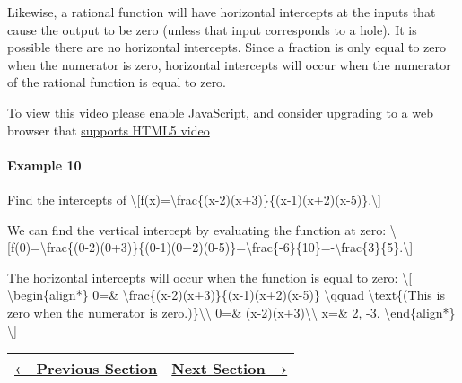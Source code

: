 Likewise, a rational function will have horizontal intercepts at the
inputs that cause the output to be zero (unless that input corresponds
to a hole). It is possible there are no horizontal intercepts. Since a
fraction is only equal to zero when the numerator is zero, horizontal
intercepts will occur when the numerator of the rational function is
equal to zero.

To view this video please enable JavaScript, and consider upgrading to a
web browser that \href{http://videojs.com/html5-video-support/}{supports
HTML5 video}

\hypertarget{example-10}{%
\paragraph{Example 10}\label{example-10}}

Find the intercepts of
\textbackslash{}{[}f(x)=\textbackslash{}frac\{(x-2)(x+3)\}\{(x-1)(x+2)(x-5)\}.\textbackslash{}{]}

We can find the vertical intercept by evaluating the function at zero:
\textbackslash{}{[}f(0)=\textbackslash{}frac\{(0-2)(0+3)\}\{(0-1)(0+2)(0-5)\}=\textbackslash{}frac\{-6\}\{10\}=-\textbackslash{}frac\{3\}\{5\}.\textbackslash{}{]}

The horizontal intercepts will occur when the function is equal to zero:
\textbackslash{}{[} \textbackslash{}begin\{align*\} 0=\&
\textbackslash{}frac\{(x-2)(x+3)\}\{(x-1)(x+2)(x-5)\}
\textbackslash{}qquad \textbackslash{}text\{(This is zero when the
numerator is zero.)\}\textbackslash{}\textbackslash{} 0=\&
(x-2)(x+3)\textbackslash{}\textbackslash{} x=\& 2, -3.
\textbackslash{}end\{align*\} \textbackslash{}{]}

\begin{longtable}[]{@{}ll@{}}
\toprule
\endhead
\href{section1-5.php}{← Previous Section} & \href{section1-7.php}{Next
Section →}\tabularnewline
\bottomrule
\end{longtable}
